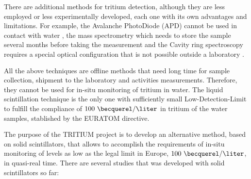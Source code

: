 There are additional methods for tritium detection, although they are less employed or less experimentally developed, each one with its own advantages and limitations. For example, the Avalanche PhotoDiode (APD) cannot be used in contact with water \cite{APD},  the mass spectrometry which needs to store the sample several months before taking the measurement \cite{Spectrometry} and the Cavity ring spectroscopy requires a special optical configuration that is not possible outside a laboratory \cite{Ring}.

All the above techniques are offline methods that need long time for sample collection, shipment to the laboratory and activities measurements. Therefore, they cannot be used for in-situ monitoring of tritium in water. The liquid scintillation technique is the only one with sufficiently small Low-Detection-Limit to fulfill the compliance of $100~\becquerel/\liter$ in tritium of the water samples, stablished by the EURATOM directive. 

The purpose of the TRITIUM project is to develop an alternative method, based on solid scintillators, that allows to accomplish the requirements of in-situ monitoring of levels as low as the legal limit in Europe, $100~\becquerel/\liter$, in quasi-real time. There are several studies that was developed with solid scintillators so far:

